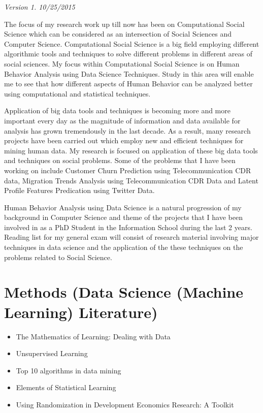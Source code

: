 \textit{Version 1. 10/25/2015} 

The focus of my research work up till now has been on Computational Social Science which can be considered as an intersection of Social Sciences and Computer Science. Computational Social Science is a big field employing different algorithmic tools and techniques to solve different problems in different areas of social sciences. My focus within Computational Social Science is on Human Behavior Analysis using Data Science Techniques. Study in this area will enable me to see that how different aspects of Human Behavior can be analyzed better using computational and statistical techniques.

Application of big data tools and techniques is becoming more and more important every day as the magnitude of information and data available for analysis has grown tremendously in the last decade. As a result, many research projects have been carried out which employ new and efficient techniques for mining human data. My research is focused on application of these big data tools and techniques on social problems. Some of the problems that I have been working on include Customer Churn Prediction using Telecommunication CDR data, Migration Trends Analysis using Telecommunication CDR Data  and Latent Profile Features Predication using Twitter Data.

Human Behavior Analysis using Data Science is a natural progression of my background in Computer Science and theme of the projects that I have been involved in as a PhD Student in the Information School during the last 2 years. 
Reading list for my general exam will consist of research material involving major techniques in data science and the application of the these techniques on the problems related to Social Science. 

\section{Methods (Data Science (Machine Learning) Literature)}
\begin{itemize}
\item The Mathematics of Learning: Dealing with Data\cite{Poggio_2005}
\item Unsupervised Learning \cite{Ghahramani_2004}

\item Top 10 algorithms in data mining \cite{2009}

\item Elements of Statistical Learning \cite{StatisticalLearning_2009}
\item Using Randomization in Development Economics Research: A Toolkit \cite{Duflo} 
\end{itemize}

